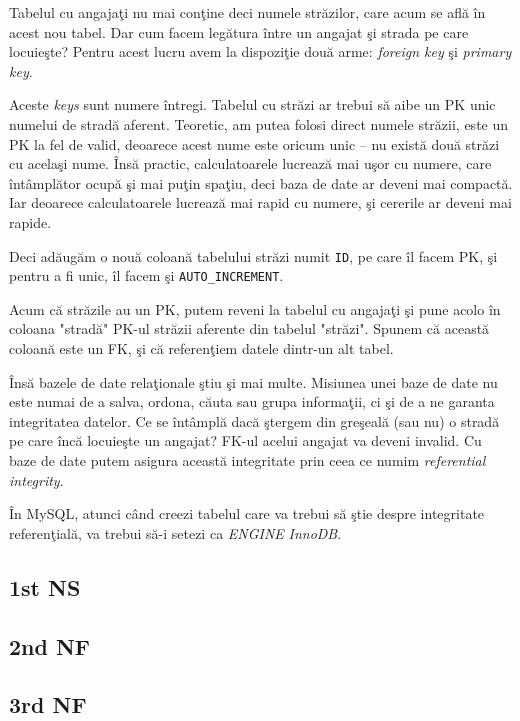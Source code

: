 Tabelul cu angajaţi nu mai conţine deci numele străzilor, care acum se află
în acest nou tabel. Dar cum facem legătura între un angajat şi strada pe care
locuieşte? Pentru acest lucru avem la dispoziţie două arme: \textsl{foreign key}
şi \textsl{primary key}.

Aceste \textit{keys} sunt numere întregi. Tabelul cu străzi ar trebui să aibe
un PK unic numelui de stradă aferent. Teoretic, am putea folosi direct
numele străzii, este un PK la fel de valid, deoarece acest nume este oricum unic --
nu există două străzi cu acelaşi nume. Însă practic, calculatoarele lucrează
mai uşor cu numere, care întâmplător ocupă şi mai puţin spaţiu, deci baza de date
ar deveni mai compactă. Iar deoarece calculatoarele lucrează mai rapid cu numere,
şi cererile ar deveni mai rapide.

Deci adăugăm o nouă coloană tabelului străzi numit \texttt{ID}, pe care îl facem
PK, şi pentru a fi unic, îl facem şi \texttt{AUTO\_INCREMENT}.

Acum că străzile au un PK, putem reveni la tabelul cu angajaţi şi pune acolo
în coloana "stradă" PK-ul străzii aferente din tabelul "străzi". Spunem că
această coloană este un FK, şi că referenţiem datele dintr-un alt tabel.

Însă bazele de date relaţionale ştiu şi mai multe. Misiunea unei baze de date
nu este numai de a salva, ordona, căuta sau grupa informaţii, ci şi de a ne
garanta integritatea datelor. Ce se întâmplă dacă ştergem din greşeală (sau nu)
o stradă pe care încă locuieşte un angajat? FK-ul acelui angajat va deveni
invalid. Cu baze de date putem asigura această integritate prin ceea ce numim
\textsl{referential integrity}.

În MySQL, atunci când creezi tabelul care va trebui să ştie despre integritate
referenţială, va trebui să-i setezi ca \textsl{ENGINE} \textsl{InnoDB}.



\subsection{1st NS}

\subsection{2nd NF}

\subsection{3rd NF}



